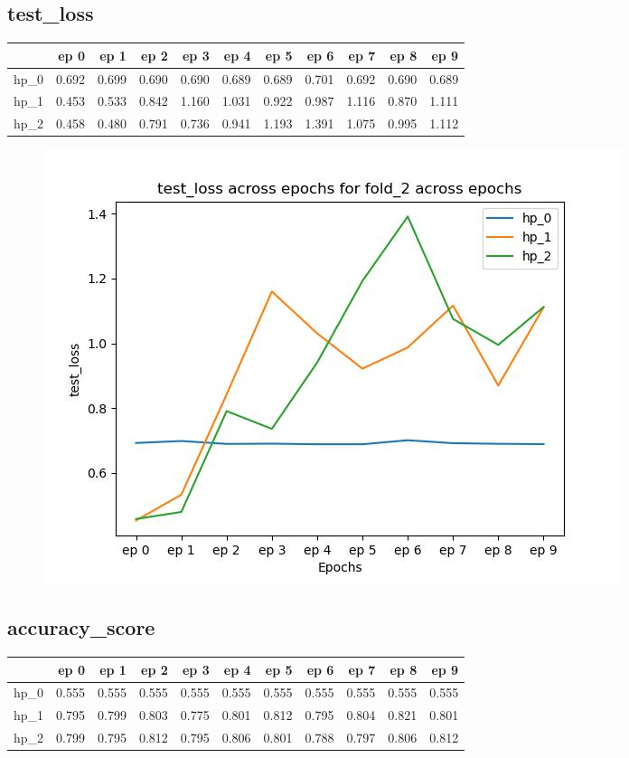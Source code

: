 \documentclass{article}
\begin{document}
\subsection{test\_loss}
\begin{tabular}{lrrrrrrrrrr}
\toprule
{} &   ep 0 &   ep 1 &   ep 2 &   ep 3 &   ep 4 &   ep 5 &   ep 6 &   ep 7 &   ep 8 &   ep 9 \\
\midrule
hp\_0 &  0.692 &  0.699 &  0.690 &  0.690 &  0.689 &  0.689 &  0.701 &  0.692 &  0.690 &  0.689 \\
hp\_1 &  0.453 &  0.533 &  0.842 &  1.160 &  1.031 &  0.922 &  0.987 &  1.116 &  0.870 &  1.111 \\
hp\_2 &  0.458 &  0.480 &  0.791 &  0.736 &  0.941 &  1.193 &  1.391 &  1.075 &  0.995 &  1.112 \\
\bottomrule
\end{tabular}

\begin{figure}[H]
\includegraphics[scale = 0.75]{fold_2/test_loss}
\end{figure}
\subsection{accuracy\_score}
\begin{tabular}{lrrrrrrrrrr}
\toprule
{} &   ep 0 &   ep 1 &   ep 2 &   ep 3 &   ep 4 &   ep 5 &   ep 6 &   ep 7 &   ep 8 &   ep 9 \\
\midrule
hp\_0 &  0.555 &  0.555 &  0.555 &  0.555 &  0.555 &  0.555 &  0.555 &  0.555 &  0.555 &  0.555 \\
hp\_1 &  0.795 &  0.799 &  0.803 &  0.775 &  0.801 &  0.812 &  0.795 &  0.804 &  0.821 &  0.801 \\
hp\_2 &  0.799 &  0.795 &  0.812 &  0.795 &  0.806 &  0.801 &  0.788 &  0.797 &  0.806 &  0.812 \\
\bottomrule
\end{tabular}
\end{document}
